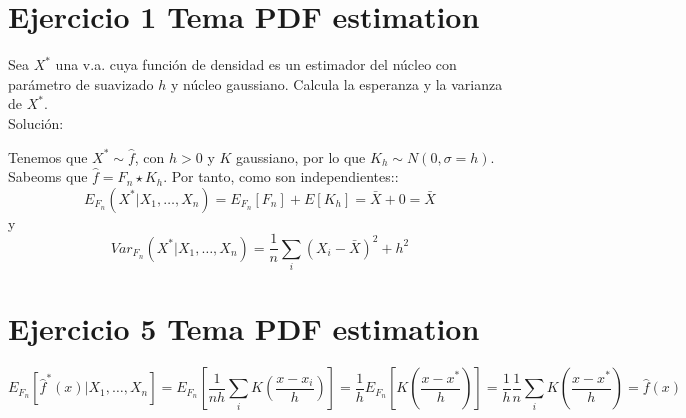 

\section{Ejercicio 1 Tema PDF estimation}

Sea \(X^*\) una v.a. cuya función de densidad es un estimador del núcleo con parámetro de suavizado \(h\) y núcleo gaussiano. Calcula la esperanza y la varianza de \(X^*\).\\

Solución:

Tenemos que \(X^* \sim \hat f\), con \(h >0\) y \(K\) gaussiano, por lo que \(K_h \sim N(0,\sigma=h)\). Sabeoms que \(\hat f = F_n \star K_h\). Por tanto, como son independientes::
\[
E_{F_n}(X^* | X_1,\dots,X_n) = E_{F_n}[F_n] + E[K_h] = \bar X + 0 = \bar X
\]
y
\[
Var_{F_n}(X^*|X_1,\dots,X_n) = \frac{1}{n} \sum_i (X_i - \bar X)^2 + h^2
\]

\section{Ejercicio 5 Tema PDF estimation}

\[
E_{F_n}\left[\hat f^*(x)| X_1,\dots,X_n\right] = E_{F_n} \left[ \frac{1}{nh} \sum_{i}K \left(\frac{x-x_i}{h}\right)\right] = \frac{1}{h} E_{F_n} \left[ K\left( \frac{x-x^*}{h}\right)\right] = \frac{1}{h} \frac{1}{n} \sum_i K\left( \frac{x-x^*}{h}\right) = \hat f(x)
\]

